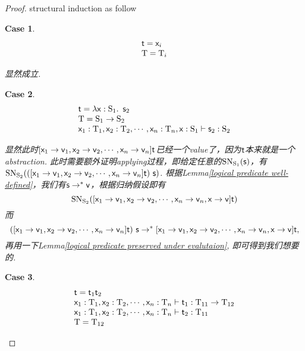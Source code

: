 \documentclass{article}
\theoremstyle{plain}
\newtheorem{case}{Case}
\theoremstyle{nonumberplain}
\newtheorem{proof}{Proof}
\newcommand{\lam}[2]{\ensuremath{\lambda #1\ldotp~ #2}} %
\newcommand{\singletype}[1]{\text{#1}}
\newcommand{\termtype}[2]{\ensuremath{#1:#2}}
\newcommand{\term}[1]{\ensuremath\mathsf{#1}}
\begin{document}
\begin{proof}
\rm structural induction as follow
\begin{case}
$$
\begin{array}{ll}
\term{t} = \term{x}_i \\
\singletype{T} = \singletype{T}_i
\end{array}
$$ 

显然成立.
\end{case}

\begin{case}
$$
\begin{array}{ll}
\term{t} = \lam{\termtype{\term{x}}{\singletype{S}_1}}{\term{s}_2} \\
\singletype{T}=\singletype{S}_1 \to \singletype{S}_2 \\
\termtype{\term{x}_1}{\singletype{T}_1},\termtype{\term{x}_2}{\singletype{T}_2},\cdots,\termtype{\term{x}_n}{\singletype{T}_n},\termtype{\term{x}}{\singletype{S}_1} \vdash \termtype{\term{s}_2}{\singletype{S}_2}
\end{array}
$$

显然此时$[\term{x}_1 \to \term{v}_1,\term{x}_2 \to \term{v}_2,\cdots,\term{x}_n \to \term{v}_n]\term{t}$已经一个value了，因为$\term{t}$本来就是一个abstraction.	此时需要额外证明applying过程，即给定任意的$\text{SN}_{\singletype{S}_1}(\term{s})$，有$\text{SN}_{\singletype{S}_2}(([\term{x}_1 \to \term{v}_1,\term{x}_2 \to \term{v}_2,\cdots,\term{x}_n \to \term{v}_n]\term{t})~\term{s})$. 根据Lemma\ref{logical predicate well-defined}，我们有$\term{s} \to^* \term{v}$，根据归纳假设即有
$$
\text{SN}_{\singletype{S}_2}([\term{x}_1 \to \term{v}_1,\term{x}_2 \to \term{v}_2,\cdots,\term{x}_n \to \term{v}_n,\term{x} \to \term{v} ]\term{t})
$$
而
$$
([\term{x}_1 \to \term{v}_1,\term{x}_2 \to \term{v}_2,\cdots,\term{x}_n \to \term{v}_n]\term{t})~\term{s} \to^* [\term{x}_1 \to \term{v}_1,\term{x}_2 \to \term{v}_2,\cdots,\term{x}_n \to \term{v}_n,\term{x} \to \term{v} ]\term{t},
$$
再用一下Lemma\ref{logical predicate preserved under evalutaion}, 即可得到我们想要的. 
\end{case}

\begin{case}
$$
\begin{array}{ll}
\term{t} = \term{t}_1\term{t}_2 \\
\termtype{\term{x}_1}{\singletype{T}_1},\termtype{\term{x}_2}{\singletype{T}_2},\cdots,\termtype{\term{x}_n}{\singletype{T}_n} \vdash \termtype{\term{t}_1}{\singletype{T}_{11} \to \singletype{T}_{12}} \\
\termtype{\term{x}_1}{\singletype{T}_1},\termtype{\term{x}_2}{\singletype{T}_2},\cdots,\termtype{\term{x}_n}{\singletype{T}_n} \vdash \termtype{\term{t}_2}{\singletype{T}_{11}} \\
\singletype{T} = \singletype{T}_{12}
\end{array}
$$


\end{case}
\end{proof}
\end{document}
